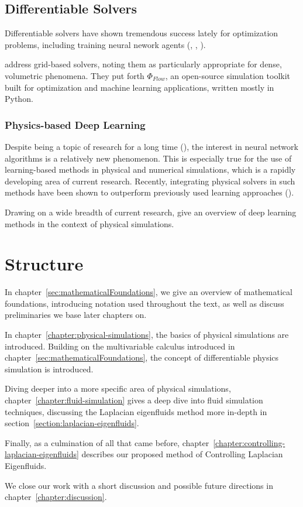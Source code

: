 \subsection{Differentiable Solvers}
Differentiable solvers have shown tremendous success lately for optimization
problems, including training neural nework agents
(\cite{holl2019pdecontrol}, \cite{difftaichi}, \cite{warp2022}).

\cite{holl2019pdecontrol} address grid-based solvers, noting them as
particularly appropriate for dense, volumetric phenomena. They put forth
$\Phi_{Flow}$, an open-source simulation toolkit built for optimization and
machine learning applications, written mostly in Python.

\subsubsection*{Physics-based Deep Learning}
Despite being a topic of research for a long time (\cite{backprop}), the
interest in neural network algorithms is a relatively new phenomenon. This is
especially true for the use of learning-based methods in physical and numerical
simulations, which is a rapidly developing area of current research. Recently,
integrating physical solvers in such methods have been shown to outperform
previously used learning approaches (\cite{solver-in-the-loop}).

Drawing on a wide breadth of current research, \cite{pbdl} give an overview of
deep learning methods in the context of physical simulations. 

\section{Structure}
In chapter~\ref{sec:mathematicalFoundations}, we give an overview of
mathematical foundations, introducing notation used throughout the text, as well
as discuss  preliminaries we base later chapters on. 

In chapter~\ref{chapter:physical-simulations}, the basics of physical
simulations are introduced. Building on the multivariable calculus introduced in
chapter~\ref{sec:mathematicalFoundations}, the concept of differentiable physics
simulation is introduced. 

Diving deeper into a more specific area of physical simulations,
chapter~\ref{chapter:fluid-simulation} gives a deep dive into fluid simulation
techniques, discussing the Laplacian eigenfluids method more in-depth in
section~\ref{section:laplacian-eigenfluids}. 

Finally, as a culmination of all that came before,
chapter~\ref{chapter:controlling-laplacian-eigenfluids} describes our proposed
method of Controlling Laplacian Eigenfluids. 

We close our work with a short discussion and possible future directions in
chapter~\ref{chapter:discussion}.
